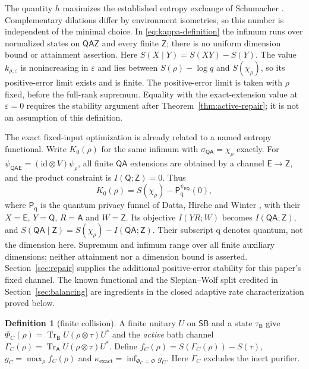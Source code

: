 \documentclass[11pt,a4paper]{article}
\numberwithin{equation}{section}
\theoremstyle{plain}
\theoremstyle{definition}
\newtheorem{definition}[theorem]{Definition}
\DeclareMathOperator{\Tr}{Tr}
\newcommand{\rg}[1]{\mathsf{#1}}
\newcommand{\id}{\mathrm{id}}
\newcommand{\Pfun}{\mathsf{P}_{\mathrm{q}}}%
\newcommand{\kexact}{\kappa_{\mathrm{exact}}}
\begin{document}
The quantity $h$ maximizes the established entropy exchange of Schumacher
\cite[section V\,A, summary (iii), p.~2622]{Schumacher1996}. Complementary
dilations differ by environment isometries, so this number is independent of
the minimal choice. In \eqref{eq:kappa-definition} the infimum runs over
normalized states on $\rg{Q}\rg{A}\rg{Z}$ and every finite $\rg{Z}$; there is
no uniform dimension bound or attainment assertion. Here
$S(X\mid Y)=S(XY)-S(Y)$. The value $k_{\rho,\varepsilon}$ is nonincreasing in
$\varepsilon$ and lies between $S(\rho)-\log q$ and $S(\chi_\rho)$, so its
positive-error limit exists and is finite. The positive-error limit is taken
with $\rho$ fixed, before the full-rank supremum. Equality with the
exact-extension value at $\varepsilon=0$ requires the stability argument after
Theorem~\ref{thm:active-repair}; it is not an assumption of this definition.

The exact fixed-input optimization is already related to a named entropy
functional. Write $K_0(\rho)$ for the same infimum with
$\sigma_{\rg{Q}\rg{A}}=\chi_\rho$ exactly. For
$\psi_{\rg{Q}\rg{A}\rg{E}}=(\id\otimes V)\psi_\rho$, all finite
$\rg{Q}\rg{A}$ extensions are obtained by a channel $\rg{E}\to\rg{Z}$, and the
product constraint is $I(\rg{Q};\rg{Z})=0$. Thus
\begin{equation}
\label{eq:exact-funnel}
K_0(\rho)=S(\chi_\rho)-\Pfun^{\psi_{\rg{E}\rg{Q}}}(0),
\end{equation}
where $\Pfun$ is the quantum privacy funnel of Datta, Hirche and Winter
\cite[section V, Eq.~(22)]{Datta2019}, with their $X=\rg{E}$, $Y=\rg{Q}$,
$R=\rg{A}$ and $W=\rg{Z}$. Its objective $I(YR;W)$ becomes
$I(\rg{Q}\rg{A};\rg{Z})$, and
$S(\rg{Q}\rg{A}\mid\rg{Z})=S(\chi_\rho)-I(\rg{Q}\rg{A};\rg{Z})$. Their
subscript $\mathrm{q}$ denotes quantum, not the dimension here. Supremum and
infimum range over all finite auxiliary dimensions; neither attainment nor a
dimension bound is asserted. Section~\ref{sec:repair} supplies the additional
positive-error stability for this paper's fixed channel. The known functional
and the Slepian--Wolf split credited in Section~\ref{sec:balancing} are
ingredients in the closed adaptive rate characterization proved below.

\begin{definition}[finite collision]
\label{def:collision}
A finite unitary $U$ on $\rg{S}\rg{B}$ and a state $\tau_{\rg{B}}$ give
$\Phi_C(\rho)=\Tr_{\rg{B}}U(\rho\otimes\tau)U^*$ and the \emph{active} bath
channel $\Gamma_C(\rho)=\Tr_{\rg{A}}U(\rho\otimes\tau)U^*$. Define
$f_C(\rho)=S(\Gamma_C(\rho))-S(\tau)$, $g_C=\max_\rho f_C(\rho)$ and
$\kexact=\inf_{\Phi_C=\Phi}g_C$. Here $\Gamma_C$ excludes the inert purifier.
\end{definition}
\end{document}
